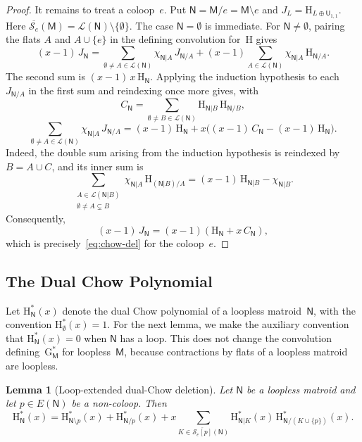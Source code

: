 \documentclass[12pt,letterpaper,english]{amsart}
\theoremstyle{teoremas}
\newtheorem{lemma}[theorem]{Lemma}
\theoremstyle{definition}
\newcommand{\M}{\mathsf{M}}
\newcommand{\N}{\mathsf{N}}
\newcommand{\U}{\mathsf{U}}
\renewcommand{\H}{\mathrm{H}}
\newcommand{\Hstar}{\mathrm{H}^{*}}
\newcommand{\Gstar}{\mathrm{G}^{*}}
\newcommand{\Se}{\mathcal{S}_e}
\begin{document}
\begin{proof}
It remains to treat a coloop~$e$.  Put $\N = \M/e = \M \setminus e$
and $J_L = \H_{L \oplus \U_{1,1}}$.
Here $\overline{\Se}(\M) = \mathcal{L}(\N) \setminus \{\emptyset\}$.
The case $\N = \emptyset$ is immediate.
For $\N \neq \emptyset$, pairing the flats $A$ and $A \cup \{e\}$ in
the defining convolution for~$\H$ gives
\[
(x-1)\, J_{\N}
= \sum_{\emptyset \neq A \in \mathcal{L}(\N)}
  \chi_{\N|A}\, J_{\N/A}
  + (x-1) \sum_{A \in \mathcal{L}(\N)}
  \chi_{\N|A}\, \H_{\N/A}.
\]
The second sum is $(x-1)\, x\, \H_{\N}$.
Applying the induction hypothesis to each $J_{\N/A}$ in the first sum
and reindexing once more gives, with
\[
C_{\N} = \sum_{\emptyset \neq B \in \mathcal{L}(\N)}
  \H_{\N|B}\, \H_{\N/B},
\]
\[
\sum_{\emptyset \neq A \in \mathcal{L}(\N)}
  \chi_{\N|A}\, J_{\N/A}
= (x-1)\, \H_{\N} + x\bigl((x-1)\, C_{\N} - (x-1)\, \H_{\N}\bigr).
\]
Indeed, the double sum arising from the induction hypothesis is reindexed
by $B = A \cup C$, and its inner sum is
\[
\sum_{\substack{A \in \mathcal{L}(\N|B) \\
    \emptyset \neq A \subsetneq B}}
  \chi_{\N|A}\, \H_{(\N|B)/A}
= (x-1)\, \H_{\N|B} - \chi_{\N|B}.
\]
Consequently,
\[
(x-1)\, J_{\N} = (x-1)(\H_{\N} + x\, C_{\N}),
\]
which is precisely~\eqref{eq:chow-del} for the coloop~$e$.
\end{proof}


\subsection{The Dual Chow Polynomial}
Let $\Hstar_{\N}(x)$ denote the dual Chow polynomial of a loopless
matroid~$\N$, with the convention $\Hstar_{\emptyset}(x) = 1$.
For the next lemma, we make the auxiliary convention that
$\Hstar_{\N}(x) = 0$ when $\N$ has a loop.
This does not change the convolution defining~$\Gstar_{\M}$ for
loopless~$\M$, because contractions by flats of a loopless matroid
are loopless.

\begin{lemma}[Loop-extended dual-Chow deletion]\label{lem:dual-chow-del}
Let $\N$ be a loopless matroid and let $p \in E(\N)$ be a non-coloop.
Then
\[
\Hstar_{\N}(x) = \Hstar_{\N \setminus p}(x) + \Hstar_{\N/p}(x)
  + x \sum_{K \in \overline{\Se[p]}(\N)}
    \Hstar_{\N|K}(x)\, \Hstar_{\N/(K \cup \{p\})}(x).
\]
\end{lemma}
\end{document}
